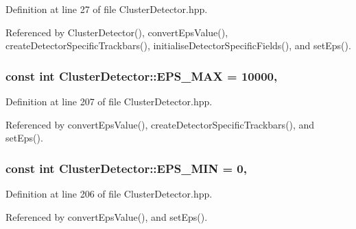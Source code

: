 Definition at line 27 of file Cluster\-Detector.\-hpp.



Referenced by Cluster\-Detector(), convert\-Eps\-Value(), create\-Detector\-Specific\-Trackbars(), initialise\-Detector\-Specific\-Fields(), and set\-Eps().

\hypertarget{classmultiscale_1_1analysis_1_1ClusterDetector_a76d0b4ecd2793d478317cc1bc856e06f}{
\subsubsection[{E\-P\-S\-\_\-\-M\-A\-X}]{\setlength{\rightskip}{0pt plus 5cm}const int Cluster\-Detector\-::\-E\-P\-S\-\_\-\-M\-A\-X = 10000\hspace{0.3cm}{\ttfamily [static]}, {\ttfamily [private]}}}\label{classmultiscale_1_1analysis_1_1ClusterDetector_a76d0b4ecd2793d478317cc1bc856e06f}


Definition at line 207 of file Cluster\-Detector.\-hpp.



Referenced by convert\-Eps\-Value(), create\-Detector\-Specific\-Trackbars(), and set\-Eps().

\hypertarget{classmultiscale_1_1analysis_1_1ClusterDetector_a6c3517e03d1fd2c6b4d6cd0d81eb8684}{
\subsubsection[{E\-P\-S\-\_\-\-M\-I\-N}]{\setlength{\rightskip}{0pt plus 5cm}const int Cluster\-Detector\-::\-E\-P\-S\-\_\-\-M\-I\-N = 0\hspace{0.3cm}{\ttfamily [static]}, {\ttfamily [private]}}}\label{classmultiscale_1_1analysis_1_1ClusterDetector_a6c3517e03d1fd2c6b4d6cd0d81eb8684}


Definition at line 206 of file Cluster\-Detector.\-hpp.



Referenced by convert\-Eps\-Value(), and set\-Eps().

